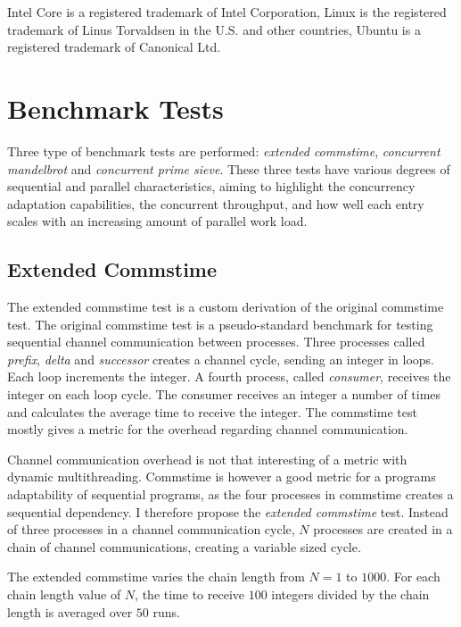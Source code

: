 Intel Core is a registered trademark of Intel Corporation, Linux is the registered trademark of Linus Torvaldsen in the U.S. and other countries, Ubuntu is a registered trademark of Canonical Ltd.


\section{Benchmark Tests}
\label{sec:benchmark_tests}


Three type of benchmark tests are performed: \textit{extended commstime}, \textit{concurrent mandelbrot} and \textit{concurrent prime sieve}. These three tests have various degrees of sequential and parallel characteristics, aiming to highlight the concurrency adaptation capabilities, the concurrent throughput, and how well each entry scales with an increasing amount of parallel work load.


\subsection{Extended Commstime}


The extended commstime test is a custom derivation of the original commstime test. The original commstime test \citep{roger2001commstime} is a pseudo\hyp{}standard benchmark for testing sequential channel communication between processes. Three processes called \textit{prefix}, \textit{delta} and \textit{successor} creates a channel cycle, sending an integer in loops. Each loop increments the integer. A fourth process, called \textit{consumer}, receives the integer on each loop cycle. The consumer receives an integer a number of times and calculates the average time to receive the integer. The commstime test mostly gives a metric for the overhead regarding channel communication.

Channel communication overhead is not that interesting of a metric with dynamic multithreading. Commstime is however a good metric for a programs adaptability of sequential programs, as the four processes in commstime creates a sequential dependency. I therefore propose the \textit{extended commstime} test. Instead of three processes in a channel communication cycle, $N$ processes are created in a chain of channel communications, creating a variable sized cycle.

The extended commstime varies the chain length from $N=1$ to $1000$. For each chain length value of $N$, the time to receive $100$ integers divided by the chain length is averaged over $50$ runs. 

